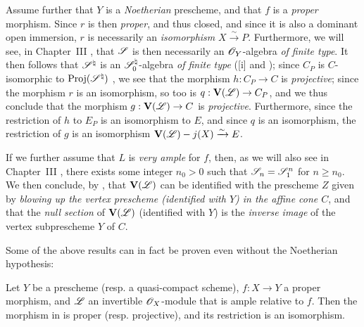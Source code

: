 \begin{remark}[8.8.3]
\label{II.8.8.3}
Assume further that $Y$ is a \emph{Noetherian} prescheme, and that $f$ is a \emph{proper} morphism.
Since $r$ is then \emph{proper}, and thus closed, and since it is also a dominant open immersion, $r$ is necessarily an \emph{isomorphism} $X\xrightarrow{\sim}P$.
Furthermore, we will see, in Chapter~III , that $\mathscr{S}$ is then necessarily an $\mathscr{O}_Y$-algebra \emph{of finite type}.
It then follows that $\mathscr{S}^\natural$ is an $\mathscr{S}_0^\natural$-algebra \emph{of finite type} ([i] and );
since $C_P$ is $C$-isomorphic to $\operatorname{Proj}(\mathscr{S}^\natural)$ , we see that the morphism $h:C_P\to C$ is \emph{projective};
since the morphism $r$ is an isomorphism, so too is $q:\bb{V}(\sh{L})\to C_P$, and we thus conclude that the morphism $g:\bb{V}(\sh{L})\to C$ is \emph{projective}.
Furthermore, since the restriction of $h$ to $E_P$ is an isomorphism to $E$, and since $q$ is an isomorphism, the restriction  of $g$ is an isomorphism $\mathbf{V}(\mathscr{L})- j(X)\xrightarrow{\sim}E$.

If we further assume that $L$ is \emph{very ample} for $f$, then, as we will also see in Chapter~III , there exists some integer $n_0>0$ such that $\mathscr{S}_n=\mathscr{S}_1^n$ for $n\geq n_0$.
We then conclude, by , that $\mathbf{V}(\mathscr{L})$ can be identified with the prescheme $Z$ given by \emph{blowing up the vertex prescheme \emph{(identified with $Y$)} in the affine cone $C$}, and that the \emph{null section} of $\mathbf{V}(\mathscr{L})$ (identified with $Y$) is the \emph{inverse image} of the vertex subprescheme $Y$ of $C$.

Some of the above results can in fact be proven even without the Noetherian hypothesis:
\end{remark}
\begin{corollary}[8.8.4]
\label{II.8.8.4}
Let $Y$ be a prescheme (resp. a quasi-compact scheme), $f:X\to Y$ a proper morphism, and $\mathscr{L}$ an invertible $\mathscr{O}_X$-module that is ample relative to $f$.
Then the morphism in  is proper (resp. projective), and its restriction  is an isomorphism.
\end{corollary}

